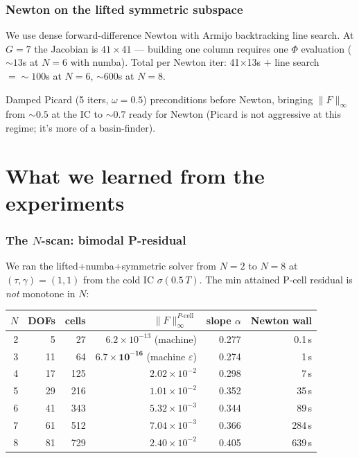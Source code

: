 \documentclass[11pt]{article}
\begin{document}
\section{Newton on the lifted symmetric subspace}

We use dense forward-difference Newton with Armijo backtracking line search.
At $G=7$ the Jacobian is $41\times 41$ — building one column requires one $\Phi$
evaluation ($\sim 13$s at $N=6$ with numba). Total per Newton iter: 41$\times$13s $+$
line search $= \sim 100$s at $N=6$, $\sim 600$s at $N=8$.

Damped Picard (5 iters, $\omega=0.5$) preconditions before Newton, bringing $\|F\|_\infty$
from $\sim 0.5$ at the IC to $\sim 0.7$ ready for Newton (Picard is not aggressive at
this regime; it's more of a basin-finder).

\newpage
\part{What we learned from the experiments}

\section{The $N$-scan: bimodal P-residual}\label{sec:nscan}

We ran the lifted+numba+symmetric solver from $N=2$ to $N=8$ at $(\tau,\gamma)=(1,1)$
from the cold IC $\sigma(0.5\,T)$. The min attained P-cell residual is \emph{not}
monotone in $N$:

\begin{center}\begin{tabular}{rrrrrr}\toprule
$N$ & DOFs & cells & $\|F\|_\infty^{P\text{-cell}}$ & slope $\alpha$ & Newton wall \\\midrule
2 & 5  & 27  & $6.2\times 10^{-13}$ (machine) & 0.277 & 0.1\,s \\
3 & 11 & 64  & $\boldsymbol{6.7\times 10^{-16}}$ (machine $\varepsilon$) & 0.274 & 1\,s \\
4 & 17 & 125 & $2.02\times 10^{-2}$ & 0.298 & 7\,s \\
5 & 29 & 216 & $1.01\times 10^{-2}$ & 0.352 & 35\,s \\
6 & 41 & 343 & $5.32\times 10^{-3}$ & 0.344 & 89\,s \\
7 & 61 & 512 & $7.04\times 10^{-3}$ & 0.366 & 284\,s \\
8 & 81 & 729 & $2.40\times 10^{-2}$ & 0.405 & 639\,s \\
\bottomrule\end{tabular}\end{center}
\end{document}

